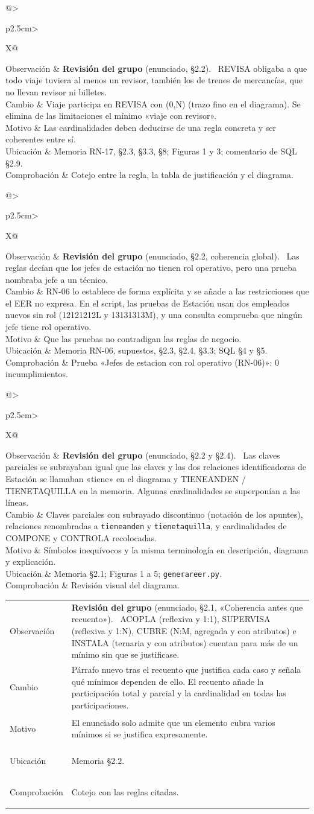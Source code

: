 \documentclass[11pt,a4paper]{article}
\makeatletter
\DeclareRobustCommand{\_}{\textunderscore\allowbreak}
\newcommand{\tb}[1]{\texttt{#1}}
\newcommand{\REV}[1]{\textbf{Revisión del grupo} (enunciado, #1).~}
\newcommand{\cambio}[7]{%
\begin{tcolorbox}[colback=white,colframe=azuluvigo,colbacktitle=azuluvigo!8,coltitle=azuluvigo,
  title={\textbf{#1}\quad #2},fonttitle=\normalsize,boxrule=0.6pt,arc=1mm,
  left=2mm,right=2mm,top=1mm,bottom=1mm,before skip=6pt,after skip=6pt]
\small
\begin{tabularx}{\linewidth}{@{}>{\bfseries\raggedright\arraybackslash}p{2.5cm}>{\raggedright\arraybackslash}X@{}}
Observación & #3\\
Cambio & #4\\
Motivo & #5\\
Ubicación & #6\\
Comprobación & #7\\
\end{tabularx}
\end{tcolorbox}}
\makeatother
\begin{document}
\cambio{F-03}{REVISA: Viaje (0,N)}
{\REV{§2.2} REVISA obligaba a que todo viaje tuviera al menos un revisor, también los de trenes de mercancías, que no llevan revisor ni billetes.}
{Viaje participa en REVISA con (0,N) (trazo fino en el diagrama). Se elimina de las limitaciones el mínimo «viaje con revisor».}
{Las cardinalidades deben deducirse de una regla concreta y ser coherentes entre sí.}
{Memoria RN-17, §2.3, §3.3, §8; Figuras 1 y 3; comentario de SQL §2.9.}
{Cotejo entre la regla, la tabla de justificación y el diagrama.}

\cambio{F-04}{Jefes de estación sin rol operativo}
{\REV{§2.2, coherencia global} Las reglas decían que los jefes de estación no tienen rol operativo, pero una prueba nombraba jefe a un técnico.}
{RN-06 lo establece de forma explícita y se añade a las restricciones que el EER no expresa. En el script, las pruebas de Estación usan dos empleados nuevos sin rol (12121212L y 13131313M), y una consulta comprueba que ningún jefe tiene rol operativo.}
{Que las pruebas no contradigan las reglas de negocio.}
{Memoria RN-06, supuestos, §2.3, §2.4, §3.3; SQL §4 y §5.}
{Prueba «Jefes de estacion con rol operativo (RN-06)»: 0 incumplimientos.}

\cambio{F-05}{Notación del diagrama}
{\REV{§2.2 y §2.4} Las claves parciales se subrayaban igual que las claves y las dos relaciones identificadoras de Estación se llamaban «tiene» en el diagrama y TIENE\_ANDEN / TIENE\_TAQUILLA en la memoria. Algunas cardinalidades se superponían a las líneas.}
{Claves parciales con subrayado discontinuo (notación de los apuntes), relaciones renombradas a \tb{tiene\_anden} y \tb{tiene\_taquilla}, y cardinalidades de COMPONE y CONTROLA recolocadas.}
{Símbolos inequívocos y la misma terminología en descripción, diagrama y explicación.}
{Memoria §2.1; Figuras 1 a 5; \tb{generar\_eer.py}.}
{Revisión visual del diagrama.}

\cambio{F-06}{Elementos que cubren varios mínimos}
{\REV{§2.1, «Coherencia antes que recuento»} ACOPLA (reflexiva y 1:1), SUPERVISA (reflexiva y 1:N), CUBRE (N:M, agregada y con atributos) e INSTALA (ternaria y con atributos) cuentan para más de un mínimo sin que se justificase.}
{Párrafo nuevo tras el recuento que justifica cada caso y señala qué mínimos dependen de ello. El recuento añade la participación total y parcial y la cardinalidad en todas las participaciones.}
{El enunciado solo admite que un elemento cubra varios mínimos si se justifica expresamente.}
{Memoria §2.2.}
{Cotejo con las reglas citadas.}
\end{document}

